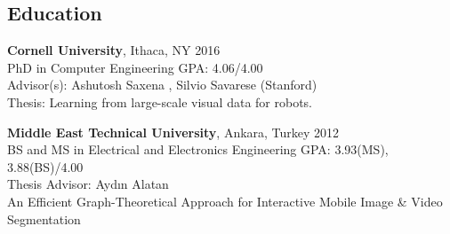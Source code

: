 \documentclass[margin,line,10pt]{resume}
\begin{document}
\begin{resume}
    \section{\mysidestyle \textcolor{olgray}{Education}}
    \textbf{Cornell University}, Ithaca, NY \hfill  2016 \vspace{1mm}\\\vspace{0mm}%
    PhD in Computer Engineering \hfill GPA: 4.06/4.00   \vspace{0mm} \\%
    Advisor(s): Ashutosh Saxena , Silvio Savarese (Stanford) \\%
    \hspace{-1mm} Thesis: 
    Learning from large-scale visual data for robots.

    \textbf{Middle East Technical University}, Ankara, Turkey  \hfill 2012 \vspace{1mm}\\\vspace{0mm}%
    BS and MS in Electrical and Electronics Engineering  \hfill GPA: 3.93(MS), 3.88(BS)/4.00 \vspace{0mm} \\\vspace{0mm}%
	  Thesis Advisor: Ayd\i n Alatan \hfill \vspace{0mm}\\\vspace{0mm}
	  \hspace{-1mm}An Efficient Graph-Theoretical Approach for Interactive Mobile Image \& Video Segmentation  \hfill \vspace{0mm}\\\vspace{-5mm} \\ %



\end{resume}
\end{document}
